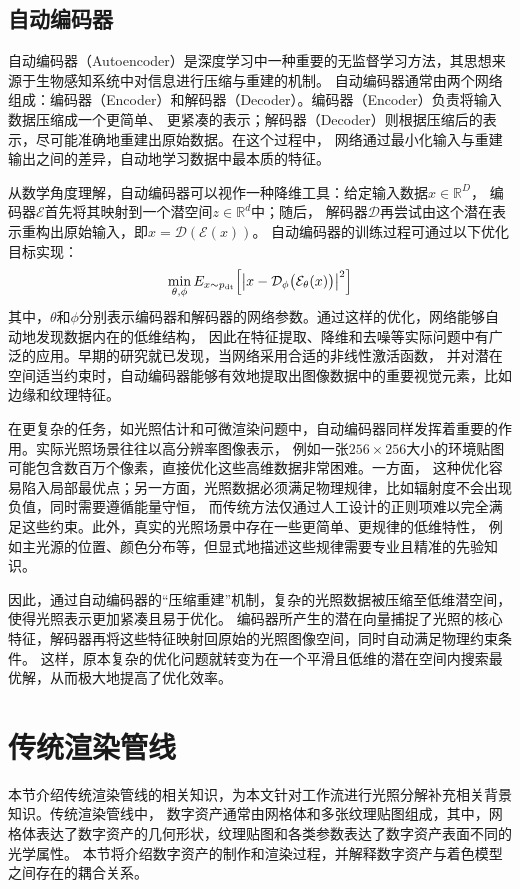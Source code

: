 \subsection{自动编码器} \label{sec:auto_encoder}
自动编码器（Autoencoder）是深度学习中一种重要的无监督学习方法，其思想来源于生物感知系统中对信息进行压缩与重建的机制。
自动编码器通常由两个网络组成：编码器（Encoder）和解码器（Decoder）。编码器（Encoder）负责将输入数据压缩成一个更简单、
更紧凑的表示；解码器（Decoder）则根据压缩后的表示，尽可能准确地重建出原始数据。在这个过程中，
网络通过最小化输入与重建输出之间的差异，自动地学习数据中最本质的特征。

从数学角度理解，自动编码器可以视作一种降维工具：给定输入数据$x\in\mathbb{R}^D$，
编码器$\mathcal{E}$首先将其映射到一个潜空间$z\in\mathbb{R}^d$中；随后，
解码器$\mathcal{D}$再尝试由这个潜在表示重构出原始输入，即$\hat{x}=\mathcal{D}\left(\mathcal{E}\left(x\right)\right)$。
自动编码器的训练过程可通过以下优化目标实现：
\begin{equation}\label{eq:ae_loss}
\min_{\theta,\phi}E_{x\sim p_{\mathrm{dt}}}\Bigl[\bigl|x-\mathcal{D}_\phi\bigl(\mathcal{E}_\theta(x)\bigr)\bigr|^2\Bigr]
\end{equation}
其中，$\theta$和$\phi$分别表示编码器和解码器的网络参数。通过这样的优化，网络能够自动地发现数据内在的低维结构，
因此在特征提取、降维和去噪等实际问题中有广泛的应用。早期的研究\cite{Hinton_2006}就已发现，当网络采用合适的非线性激活函数，
并对潜在空间适当约束时，自动编码器能够有效地提取出图像数据中的重要视觉元素，比如边缘和纹理特征。

在更复杂的任务，如光照估计和可微渲染问题中，自动编码器同样发挥着重要的作用。实际光照场景往往以高分辨率图像表示，
例如一张$256\times256$大小的环境贴图可能包含数百万个像素，直接优化这些高维数据非常困难。一方面，
这种优化容易陷入局部最优点；另一方面，光照数据必须满足物理规律，比如辐射度不会出现负值，同时需要遵循能量守恒，
而传统方法仅通过人工设计的正则项难以完全满足这些约束。此外，真实的光照场景中存在一些更简单、更规律的低维特性，
例如主光源的位置、颜色分布等，但显式地描述这些规律需要专业且精准的先验知识。

因此，通过自动编码器的“压缩重建”机制，复杂的光照数据被压缩至低维潜空间，使得光照表示更加紧凑且易于优化。
编码器所产生的潜在向量捕捉了光照的核心特征，解码器再将这些特征映射回原始的光照图像空间，同时自动满足物理约束条件。
这样，原本复杂的优化问题就转变为在一个平滑且低维的潜在空间内搜索最优解，从而极大地提高了优化效率。

\section{传统渲染管线}
本节介绍传统渲染管线的相关知识，为本文针对工作流进行光照分解补充相关背景知识。传统渲染管线中，
数字资产通常由网格体和多张纹理贴图组成，其中，网格体表达了数字资产的几何形状，纹理贴图和各类参数表达了数字资产表面不同的光学属性。
本节将介绍数字资产的制作和渲染过程，并解释数字资产与着色模型之间存在的耦合关系。

